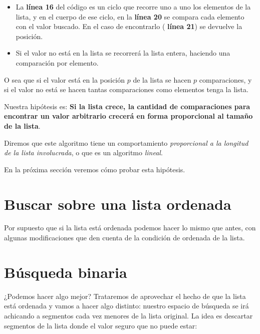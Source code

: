 \begin{itemize}
\item La {\bf línea 16} del código es un ciclo que recorre uno a uno los
elementos de la lista, y en el cuerpo de ese ciclo, en la {\bf línea 20} se
compara cada elemento con el valor buscado. En el caso de encontrarlo ({\bf
línea 21}) se devuelve la posición.

\item Si el valor no está en la lista se recorrerá la lista entera, haciendo
una comparación por elemento.
\end{itemize}

O sea que si el valor está en la posición $p$ de la lista se hacen $p$
comparaciones, y si el valor no está se hacen tantas comparaciones como
elementos tenga la lista.

Nuestra hipótesis es: {\bf Si la lista crece, la cantidad de comparaciones
para encontrar un valor arbitrario crecerá en forma proporcional al tamaño de
la lista}.

Diremos que este algoritmo tiene un comportamiento {\it proporcional a la
longitud de la lista involucrada}, o que es un algoritmo {\it lineal}.

En la próxima sección veremos cómo probar esta hipótesis.

\section{Buscar sobre una lista ordenada}

Por supuesto que si la lista está ordenada podemos hacer lo mismo que antes,
con algunas modificaciones que den cuenta de la condición de ordenada de la
lista.


\section{Búsqueda binaria}

¿Podemos hacer algo mejor? Trataremos de aprovechar el hecho de que la lista
está ordenada y vamos a hacer algo distinto: nuestro espacio de búsqueda se
irá achicando a segmentos cada vez menores de la lista original.
La idea es descartar segmentos de la lista donde el valor seguro que no puede
estar:

